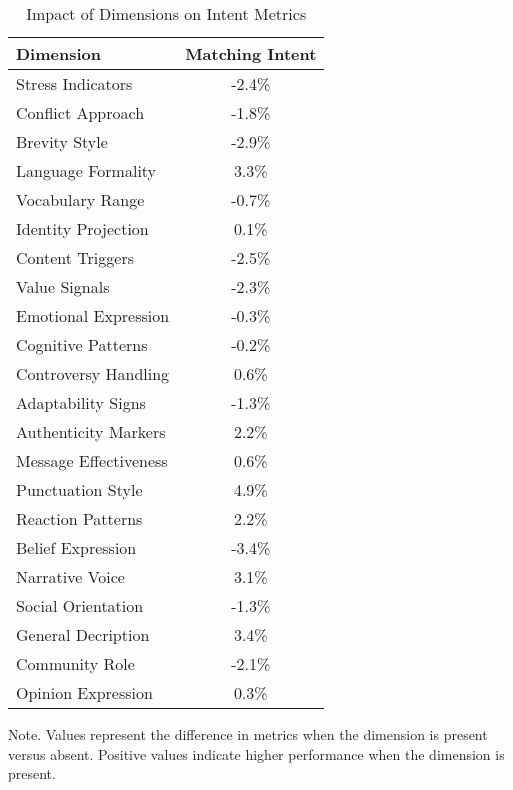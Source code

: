 \begin{table}
\caption{Impact of Dimensions on Intent Metrics}
\label{table5}
\begin{tabular}{lc}
\hline
Dimension & Matching Intent \\
\hline
Stress Indicators & -2.4\% \\
Conflict Approach & -1.8\% \\
Brevity Style & -2.9\% \\
Language Formality & 3.3\% \\
Vocabulary Range & -0.7\% \\
Identity Projection & 0.1\% \\
Content Triggers & -2.5\% \\
Value Signals & -2.3\% \\
Emotional Expression & -0.3\% \\
Cognitive Patterns & -0.2\% \\
Controversy Handling & 0.6\% \\
Adaptability Signs & -1.3\% \\
Authenticity Markers & 2.2\% \\
Message Effectiveness & 0.6\% \\
Punctuation Style & 4.9\% \\
Reaction Patterns & 2.2\% \\
Belief Expression & -3.4\% \\
Narrative Voice & 3.1\% \\
Social Orientation & -1.3\% \\
General Decription & 3.4\% \\
Community Role & -2.1\% \\
Opinion Expression & 0.3\% \\
\hline
\end{tabular}
\begin{tablenotes}
\small
\item Note. Values represent the difference in metrics when the dimension is present versus absent. Positive values indicate higher performance when the dimension is present.
\end{tablenotes}
\end{table}